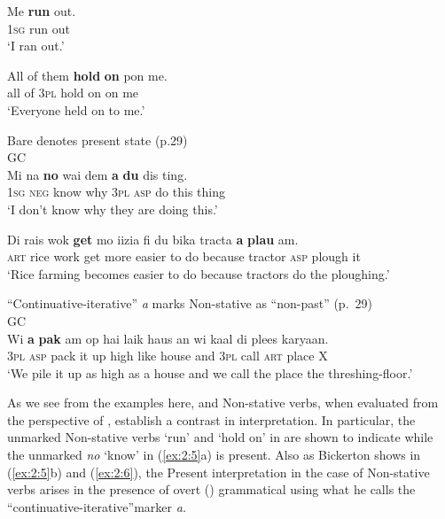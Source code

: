 \ex
\gll Me  \textbf{run} out.\\
\textsc{1sg} run out\\
\glt `I ran out.'

\ex All of    them \textbf{hold} \textbf{on} pon me.\\
    all of    \textsc{3pl}  hold on on me\\
\glt `Everyone held on to me.' \z \z

\ea\label{ex:2:5}
{Bare  denotes present state (p.29)}\\
GC  \\
\ea
\gll Mi na \textbf{no} wai dem \textbf{a} \textbf{du} dis ting.\\
        \textsc{1sg}  \textsc{neg} know why \textsc{3pl} \textsc{asp} do this thing\\
\glt `I don’t know why they are doing this.'

\ex
\gll Di       rais wok \textbf{get} mo     iizia      fi du bika           tracta  \textbf{a}        \textbf{plau}  am.\\
\textsc{art} rice work get more easier to do because tractor \textsc{asp}   plough   it\\
\glt `Rice farming becomes easier to do because tractors do the ploughing.'
\z
\z

\ea\label{ex:2:6} ``Continuative-iterative'' \textit{a} marks
Non-stative as ``non-past'' {(p.~29)}\\
GC\\
\gll  Wi                      \textbf{a}      \textbf{pak} am op hai     laik  haus     an      wi  kaal di   plees karyaan.\\
\textsc{3pl} \textsc{asp} pack    it   up high like house and \textsc{3pl} call \textsc{art} place X\\
\glt `We pile it up as high as a house and we call the place the threshing-floor.' \z

As we see from the examples here,  and Non-stative verbs, when
evaluated from the perspective of , establish a contrast in
interpretation.  In particular, the unmarked Non-stative verbs `run'
and `hold on' in  are shown to indicate  while the
unmarked  \textit{no} `know' in (\ref{ex:2:5}a) is present.
Also as Bickerton shows in (\ref{ex:2:5}b) and (\ref{ex:2:6}), the
Present  interpretation in the case of Non-stative verbs arises
in the presence of overt () grammatical 
using what he calls the ``continuative-iterative”marker \textit{a.}

